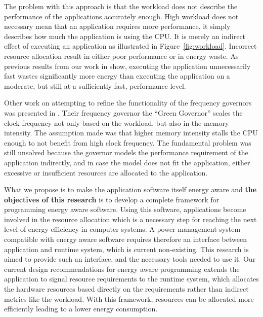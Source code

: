 \documentclass{article}
\begin{document}
The problem with this approach is that the workload does not describe the performance of the applications accurately enough.
High workload does not necessary mean that an application requires more performance, it simply describes how much the application is using the CPU.
It is merely an indirect effect of executing an application as illustrated in Figure~\ref{fig:workload}.
Incorrect resource allocation result in either poor performance or in energy waste.
As previous results from our work in \cite{HolmbackaHipeac, HolmbackaDasip} show, executing the application unnecessarily fast wastes significantly more energy than executing the application on a moderate, but still at a sufficiently fast, performance level.\smallskip

Other work on attempting to refine the functionality of the frequency governors was presented in \cite{Spiliopoulos:11}.
Their frequency governor the ``Green Governor'' scales the clock frequency not only based on the workload, but also in the memory intensity.
The assumption made was that higher memory intensity stalls the CPU enough to not benefit from high clock frequency.
The fundamental problem was still unsolved because the governor models the performance requirement of the application indirectly,
and in case the model does not fit the application, either excessive or insufficient resources are allocated to the application.\smallskip

What we propose is to make the application software itself energy aware and \textbf{the objectives of this research} is to develop a complete framework for programming energy aware software.
Using this software, applications become involved in the resource allocation which is a necessary step for reaching the next level of energy efficiency in computer systems.
A power management system compatible with energy aware software requires therefore an interface between application and runtime system, which is current non-existing.
This research is aimed to provide such an interface, and the necessary tools needed to use it.
Our current design recommendations for energy aware programming extends the application to signal resource requirements to the runtime system, which allocates the hardware resources based directly on the requirements rather than indirect metrics like the workload.
With this framework, resources can be allocated more efficiently leading to a lower energy consumption.
\end{document}
